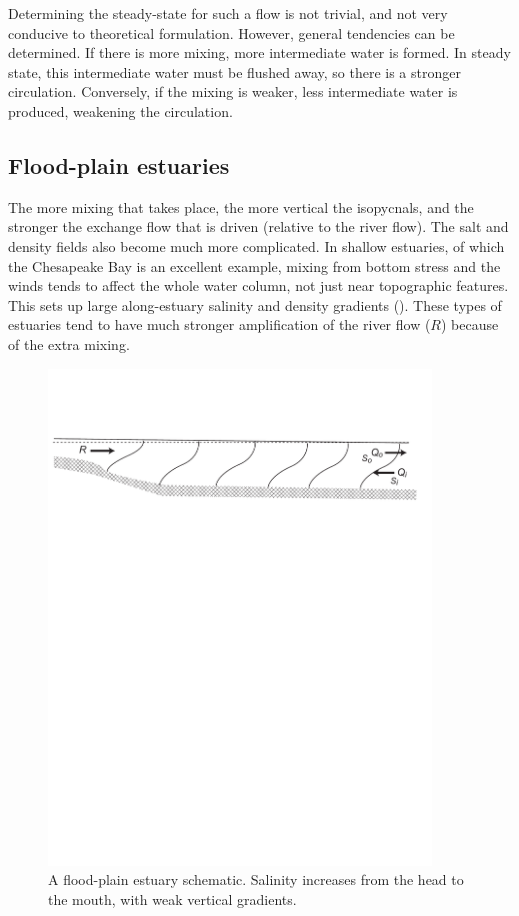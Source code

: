 Determining the steady-state for such a flow is not trivial, and not very conducive to theoretical formulation.  However, general tendencies can be determined.  If there is more mixing, more intermediate water is formed. In steady state, this intermediate water must be flushed away, so there is a stronger circulation.  Conversely, if the mixing is weaker, less intermediate water is produced, weakening the circulation.

\subsection{Flood-plain estuaries}

The more mixing that takes place, the more vertical the isopycnals, and the stronger the exchange flow that is driven (relative to the river flow).  The salt and density fields also become much more complicated.  In shallow estuaries, of which the Chesapeake Bay is an excellent example, mixing from bottom stress and the winds tends to affect the whole water column, not just near topographic features.  This sets up large along-estuary salinity and density gradients (). These types of estuaries tend to have much stronger amplification of the river flow ($R$) because of the extra mixing.

\begin{figure}[htb]
  \centering
  \includegraphics[width=4in]{figs/EstuaryHigh}
  \caption{A flood-plain estuary schematic.  Salinity increases from
    the head to the mouth, with weak vertical gradients.  }
  \label{fig:EstuaryHigh}
\end{figure}


